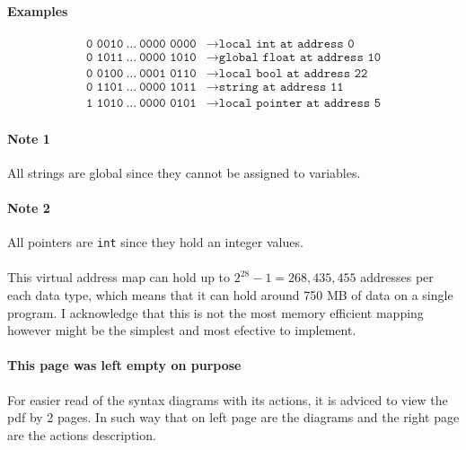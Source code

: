 \paragraph{Examples}
\begin{align*}
    \texttt{0 0010}\ \dots\ \texttt{0000 0000}
    &\rightarrow \texttt{local int at address 0}\\
    \texttt{0 1011}\ \dots\ \texttt{0000 1010}
    &\rightarrow \texttt{global float at address 10}\\
    \texttt{0 0100}\ \dots\ \texttt{0001 0110}
    &\rightarrow \texttt{local bool at address 22}\\
    \texttt{0 1101}\ \dots\ \texttt{0000 1011}
    &\rightarrow \texttt{string at address 11}\\
    \texttt{1 1010}\ \dots\ \texttt{0000 0101}
    &\rightarrow \texttt{local pointer at address 5}
\end{align*}

\paragraph{Note 1} All strings are global since they cannot be assigned to
variables.

\paragraph{Note 2} All pointers are \texttt{int} since they hold an integer values.

\paragraph{} This virtual address map can hold up to $2^{28} - 1 = 268,435,455$
addresses per each data type, which means that it can hold around 750 MB of
data on a single program. I acknowledge that this is not the most memory
efficient mapping however might be the simplest and most efective to
implement.

\newpage

\paragraph{This page was left empty on purpose} For easier read of the syntax
diagrams with its actions, it is adviced to view the pdf by 2 pages. In such
way that on left page are the diagrams and the right page are the actions
description.

\newpage


